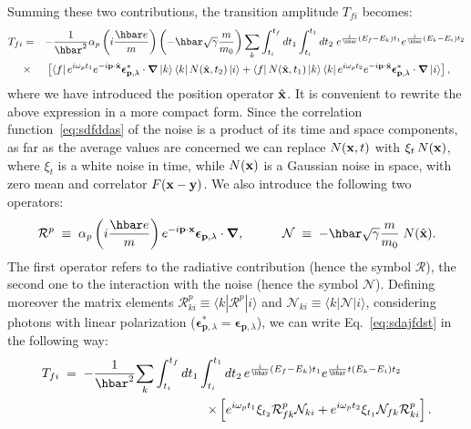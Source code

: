 \documentclass[12pt,onecolumn,amssymb,nofootinbib]{revtex4-2} %
\newcommand*{\boldvec}[1]{\ensuremath{\boldsymbol{#1}}}%
\let\vec\boldvec%
\begin{document}
Summing these two contributions, the transition amplitude $T_{fi}$ becomes:
\begin{eqnarray} \label{eq:sdajfdst}
T_{fi} & = & -\frac{1}{\hbar^{2}}\alpha_{p}\left(i\frac{\hbar e}{m}\right)
\left(-\hbar \sqrt{\gamma}\frac{m}{m_{0}}\right)\underset{k}{\sum}\int_{t_{i}}^{t_{f}}dt_{1}
\int_{t_{i}}^{t_{1}}dt_{2}\; e^{\frac{i}{\hbar}\left(E_{f}-E_{k}\right)
t_{1}}e^{\frac{i}{\hbar}\left(E_{k}-E_{i}\right)t_{2}} \nonumber \\
& \times & \left[\left\langle f\right|e^{i\omega_{p}t_{1}}e^{-i\mathbf{p}
\cdot\hat{\mathbf{x}}}\vec{\epsilon}_{\mathbf{p},\lambda}^{*}\cdot\vec{\nabla}\left|k\right
\rangle
\left\langle k\right|N(\hat{{\bf x}}, t_{2})
\left|i\right\rangle
 +
\left\langle f\right|N(\hat{{\bf x}}, t_{1})
\left|k\right\rangle \left\langle k\right|e^{i\omega_{p}t_{2}}
e^{-i\mathbf{p}\cdot\hat{\mathbf{x}}}\vec{\epsilon}_{\mathbf{p},\lambda}^{*}
\cdot \vec{\nabla}\left|i\right\rangle
\right],\;\;\;\;\;
\end{eqnarray}
where we have introduced the position operator $\hat{{\bf x}}$. It is
convenient to rewrite the above expression in a more compact form. Since the
correlation function~\eqref{eq:sdfddas} of the noise is a product of its
time and space components, as far as the average values are concerned we
can replace $N({\bf x}, t)$ with $\xi_t \, N({\bf x})$, where $\xi_t$ is a
white noise in time, while $N({\bf x})$ is a Gaussian noise in space, with zero
mean and correlator $F({\bf x} - {\bf y})$. We also introduce the following two
operators:
\begin{equation}
{\mathcal{R}}^{p} \; \equiv \; \alpha_{p}
\left(i\frac{\hbar e}{m}\right) e^{-i\mathbf{p}\cdot\mathbf{x}}
\vec{\epsilon}_{\mathbf{p},\lambda}\cdot \vec{\nabla}, \qquad\quad
{\mathcal{N}} \; \equiv \;
-\hbar \sqrt{\gamma}\frac{m}{m_{0}}\; N(\hat{{\bf x}}).
\end{equation}
The first operator refers to the radiative contribution (hence the symbol
${\mathcal{R}}$), the second one to the interaction with the noise (hence the
symbol ${\mathcal{N}}$). Defining moreover the matrix elements ${\mathcal
R}_{ki}^{p} \equiv \langle k | {\mathcal R}^{p} |i \rangle $ and ${\mathcal
N}_{ki} \equiv \langle k | {\mathcal N} |i \rangle $, considering photons
with linear polarization ($\vec{\epsilon}_{\mathbf{p},\lambda}^{*} =
\vec{\epsilon}_{\mathbf{p},\lambda}$), we can write Eq.~\eqref{eq:sdajfdst} in
the following way:
\begin{eqnarray} \label{eq:ta_fin}
\lefteqn{T_{fi} \; = \;
-\frac{1}{\hbar^{2}}\underset{k}{\sum}\int_{t_{i}}^{t_{f}}dt_{1}
\int_{t_{i}}^{t_{1}}dt_{2}\,
e^{\frac{i}{\hbar}(E_{f}-E_{k})t_{1}}
e^{\frac{i}{\hbar}t(E_{k}-E_{i})t_{2}}} \qquad\qquad\qquad\qquad && \nonumber \\
& & \qquad\qquad\times \left[e^{i\omega_{p}t_{1}}\xi_{t_{2}}
{\mathcal R}_{fk}^{p}{\mathcal N}_{ki}
+
e^{i\omega_{p}t_{2}}\xi_{t_{1}}
{\mathcal N}_{fk}{\mathcal R}_{ki}^{p}
\right].
\end{eqnarray}
\end{document}
